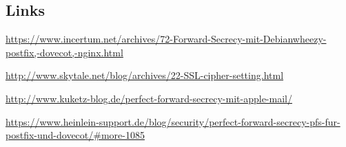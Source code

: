 \subsection{Links}



\url{https://www.incertum.net/archives/72-Forward-Secrecy-mit-Debianwheezy-postfix,-dovecot,-nginx.html}

\url{http://www.skytale.net/blog/archives/22-SSL-cipher-setting.html}

\url{http://www.kuketz-blog.de/perfect-forward-secrecy-mit-apple-mail/}

\url{https://www.heinlein-support.de/blog/security/perfect-forward-secrecy-pfs-fur-postfix-und-dovecot/#more-1085}


